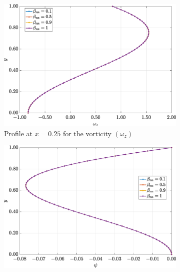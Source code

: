 \documentclass[preprint, 12pt]{elsarticle}
\begin{document}
\begin{figure}[H]
\begin{subfigure}[b]{.46\textwidth}
        \label{fig_slice_x_v_2nd_Case1_oldorydb}
    \end{subfigure}
    \begin{subfigure}[b]{.46\textwidth}
        \includegraphics[width=\textwidth]{Slice_x_Tog_Numerical_NormErr_2nd_Betann_1_Re_1000_Wi_1_epsilon_0_xi_0_alphaG_0_Dt_1e-06_at_0.05_tipsim_1_MMS_12_x0.25y0.25_Wz.eps}
        \caption{Profile at $x=0.25$ for the vorticity $(\omega_{z})$}
        \label{fig_slice_x_wz_2nd_Case1_oldroydB}
    \end{subfigure}
    \vspace{0.2cm}
    \qquad
    \begin{subfigure}[b]{.46\textwidth}
        \includegraphics[width=\textwidth]{Slice_x_Tog_Numerical_NormErr_2nd_Betann_1_Re_1000_Wi_1_epsilon_0_xi_0_alphaG_0_Dt_1e-06_at_0.05_tipsim_1_MMS_12_x0.25y0.25_Psi.eps}

\end{subfigure}
\end{figure}
\end{document}
